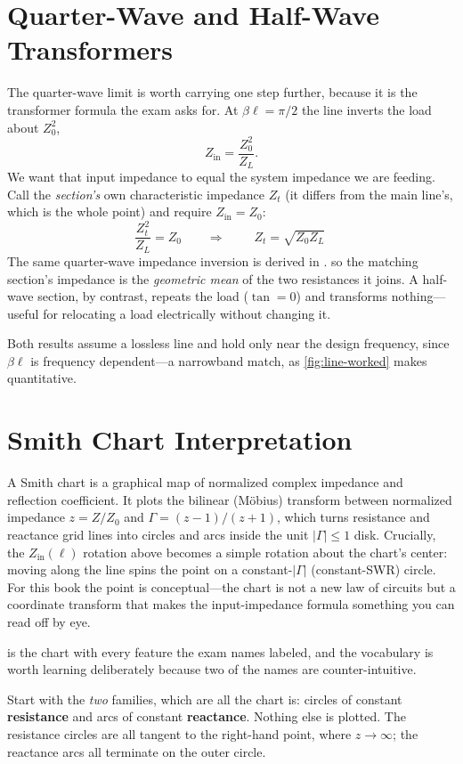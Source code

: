 \section{Quarter-Wave and Half-Wave Transformers}
\label{sec:quarterwave}
The quarter-wave limit is worth carrying one step further, because it is the
transformer formula the exam asks for. At \(\beta\ell=\pi/2\) the line inverts the
load about \(Z_0^2\),
\[
Z_{\mathrm{in}}=\frac{Z_0^2}{Z_L}.
\]
We want that input impedance to equal the system impedance we are feeding. Call the
\emph{section's} own characteristic impedance \(Z_t\) (it differs from the main
line's, which is the whole point) and require \(Z_{\mathrm{in}}=Z_0\):
\[
\frac{Z_t^2}{Z_L}=Z_0
\qquad\Longrightarrow\qquad
\boxed{\;Z_t=\sqrt{Z_0Z_L}\;}
\]
The same quarter-wave impedance inversion is derived in
\cite[pp.~63--64]{free2022rfmicrowave}.
so the matching section's impedance is the \emph{geometric mean} of the two
resistances it joins. A half-wave section, by contrast, repeats the load
(\(\tan=0\)) and transforms nothing---useful for relocating a load electrically
without changing it.

Both results assume a lossless line and hold only near the design frequency, since
\(\beta\ell\) is frequency dependent---a narrowband match, as
\cref{fig:line-worked} makes quantitative.

\section{Smith Chart Interpretation}
A Smith chart is a graphical map of normalized complex impedance and reflection
coefficient. It plots the bilinear (M\"obius) transform between normalized
impedance \(z=Z/Z_0\) and \(\Gamma=(z-1)/(z+1)\), which turns resistance and
reactance grid lines into circles and arcs inside the unit \(|\Gamma|\le1\) disk.
Crucially, the \(Z_{\mathrm{in}}(\ell)\) rotation above becomes a simple rotation
about the chart's center: moving along the line spins the point on a
constant-\(|\Gamma|\) (constant-SWR) circle. For this book the point is
conceptual---the chart is not a new law of circuits but a coordinate transform
that makes the input-impedance formula something you can read off by eye.

 is the chart with every feature the exam names labeled, and
the vocabulary is worth learning deliberately because two of the names are
counter-intuitive.

Start with the \emph{two} families, which are all the chart is: circles of constant
\textbf{resistance} and arcs of constant \textbf{reactance}. Nothing else is plotted.
The resistance circles are all tangent to the right-hand point, where \(z\to\infty\);
the reactance arcs all terminate on the outer circle.

